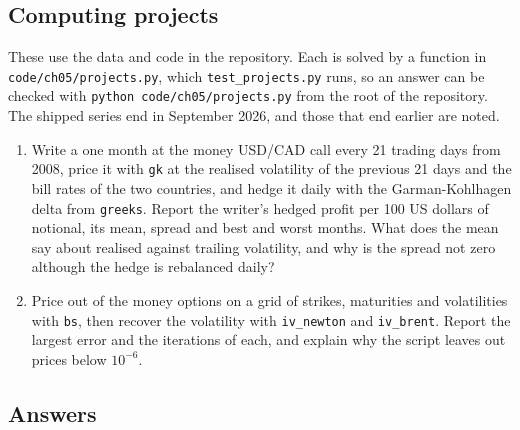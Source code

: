 \begin{chapterrefs}
\subsection*{Computing projects}
\label{sec5:projects}
These use the data and code in the repository. Each is solved by a function in
\texttt{code/ch05/projects.py}, which \texttt{test\_projects.py} runs, so an answer can be
checked with \texttt{python code/ch05/projects.py} from the root of the repository. The
shipped series end in September 2026, and those that end earlier are noted.

\begin{enumerate}[label=\textbf{P5.\arabic*}, leftmargin=*, ref=P5.\arabic*]
\item Write a one month at the money USD/CAD call every 21 trading days from 2008, price it with \texttt{gk}
at the realised volatility of the previous 21 days and the bill rates of the two countries, and hedge it
daily with the Garman-Kohlhagen delta from \texttt{greeks}. Report the writer's hedged profit per 100 US
dollars of notional, its mean, spread and best and worst months. What does the mean say about realised
against trailing volatility, and why is the spread not zero although the hedge is rebalanced daily?
\item Price out of the money options on a grid of strikes, maturities and volatilities with \texttt{bs},
then recover the volatility with \texttt{iv\_newton} and \texttt{iv\_brent}. Report the largest error and
the iterations of each, and explain why the script leaves out prices below $10^{-6}$.
\end{enumerate}

\subsection*{Answers}


\end{chapterrefs}
